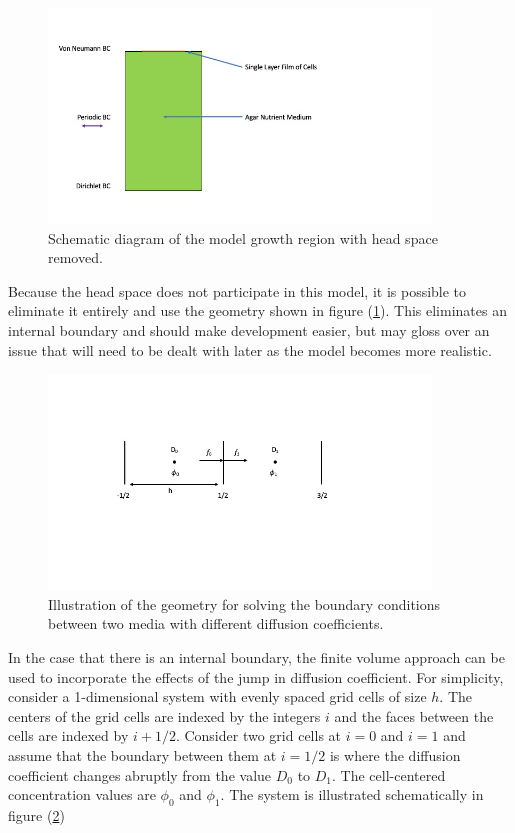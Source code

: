 \documentclass[12pt]{article}
\begin{document}
\begin{figure}
\centering
\includegraphics[width=4.0in,keepaspectratio=true]{ReducedSys}
\caption{\label{reducedsys} Schematic diagram of the model growth region with
head space removed.}
\end{figure}
Because the head space does not participate in this
model, it is possible to eliminate it entirely and use the geometry shown in
figure (\ref{reducedsys}). This eliminates an internal boundary and should make
development easier, but may gloss over an issue that will need to be dealt with
later as the model becomes more realistic.

\begin{figure}
\centering
\includegraphics[width=4.0in,keepaspectratio=true]{DiffBC}
\caption{\label{diffbc} Illustration of the geometry for solving the boundary
conditions between two media with different diffusion coefficients.}
\end{figure}
In the case that there is an internal boundary, the finite volume approach can
be used to incorporate the effects of the jump in diffusion coefficient. For
simplicity, consider a 1-dimensional system with evenly spaced grid cells of
size $h$. The centers of the grid cells are indexed by the integers $i$ and the
faces between the cells are indexed by $i+1/2$. Consider two grid cells at $i=0$
and $i=1$ and assume that the boundary between them at $i=1/2$ is where the
diffusion coefficient changes abruptly from the value $D_0$ to $D_1$. The
cell-centered concentration values are $\phi_0$ and $\phi_1$. The system is
illustrated schematically in figure (\ref{diffbc})
\end{document}
